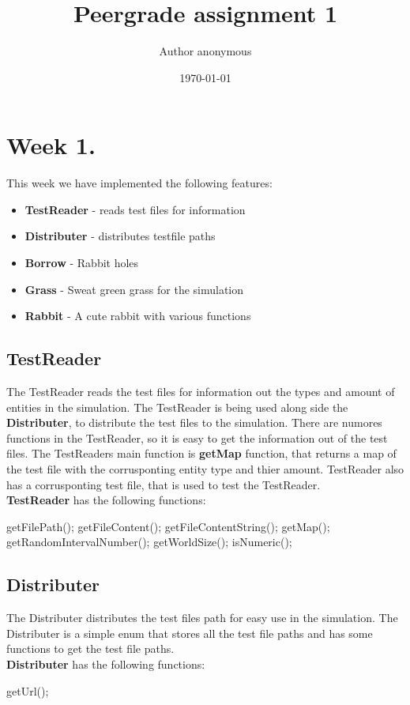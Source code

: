 \documentclass[11pt]{article}
\begin{document}
    \title{Peergrade assignment 1}
    \author{Author anonymous} %
    \date{\today}

    \section*{Week 1. }
    This week we have implemented the following features:
    \begin{itemize}
        \item \textbf{TestReader} - reads test files for information
        \item \textbf{Distributer} - distributes testfile paths
        \item \textbf{Borrow} - Rabbit holes
        \item \textbf{Grass} - Sweat green grass for the simulation
        \item \textbf{Rabbit} - A cute rabbit with various functions
    \end{itemize}

    \subsection*{TestReader}
    The TestReader reads the test files for information out the types and amount of entities in the simulation. The TestReader is being used along side the \textbf{Distributer}, to distribute the test files to the simulation.
    There are numores functions in the TestReader, so it is easy to get the information out of the test files. 
    The TestReaders main function is \textbf{getMap} function, that returns a map of the test file with the corrusponting entity type and thier amount. 
    TestReader also has a corrusponting test file, that is used to test the TestReader.
    \\
    \textbf{TestReader} has the following functions:
    \begin{mdframed}
        getFilePath(); getFileContent(); getFileContentString(); getMap(); getRandomIntervalNumber(); getWorldSize(); isNumeric();
    \end{mdframed}
    \subsection*{Distributer}
    The Distributer distributes the test files path for easy use in the simulation. The Distributer is a simple enum that stores all the test file paths and has some functions to get the test file paths.
    \\
    \textbf{Distributer} has the following functions:
    \begin{mdframed}
        getUrl();
    \end{mdframed}
\end{document}
